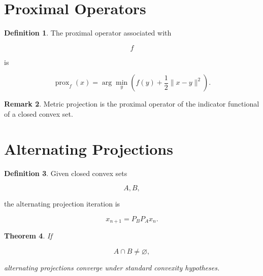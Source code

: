 \documentclass[11pt]{book}
\numberwithin{equation}{chapter}
\theoremstyle{definition}
\newtheorem{definition}{Definition}[chapter]
\newtheorem{remark}[definition]{Remark}
\theoremstyle{plain}
\newtheorem{theorem}[definition]{Theorem}
\begin{document}

\section{Proximal Operators}

\begin{definition}

The proximal operator associated with

\[
f
\]

is

\[
\operatorname{prox}_f(x)
=
\arg\min_y
\left(
f(y)
+
\frac12
\|x-y\|^2
\right).
\]

\end{definition}


\begin{remark}

Metric projection is the proximal operator of the indicator functional
of a closed convex set.

\end{remark}


\section{Alternating Projections}

\begin{definition}

Given closed convex sets

\[
A,
B,
\]

the alternating projection iteration is

\[
x_{n+1}
=
P_BP_Ax_n.
\]

\end{definition}


\begin{theorem}

If

\[
A\cap B\neq\varnothing,
\]

alternating projections converge under standard convexity hypotheses.

\end{theorem}

\end{document}
